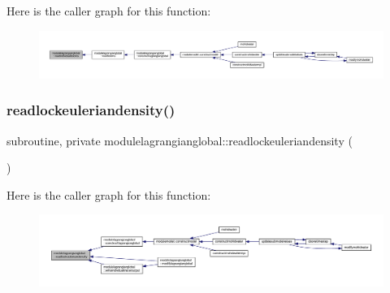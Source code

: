 Here is the caller graph for this function\+:\nopagebreak
\begin{figure}[H]
\begin{center}
\leavevmode
\includegraphics[width=350pt]{namespacemodulelagrangianglobal_ac534055f33c12be80f6b5d331e9cca95_icgraph}
\end{center}
\end{figure}
\mbox{\label{namespacemodulelagrangianglobal_a050ae9cc2e89b6c4a9988fc3de650380}} 
\subsubsection{\texorpdfstring{readlockeuleriandensity()}{readlockeuleriandensity()}}
{\footnotesize\ttfamily subroutine, private modulelagrangianglobal\+::readlockeuleriandensity (\begin{DoxyParamCaption}{ }\end{DoxyParamCaption})\hspace{0.3cm}{\ttfamily [private]}}

Here is the caller graph for this function\+:\nopagebreak
\begin{figure}[H]
\begin{center}
\leavevmode
\includegraphics[width=350pt]{namespacemodulelagrangianglobal_a050ae9cc2e89b6c4a9988fc3de650380_icgraph}
\end{center}
\end{figure}
\mbox{\label{namespacemodulelagrangianglobal_a4051f81e28e0e18dc8950a11d2a7ae65}} 
